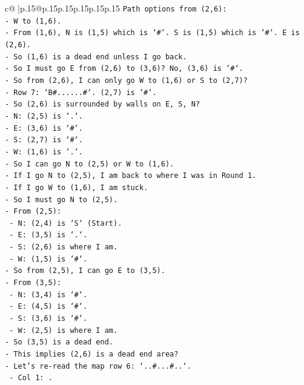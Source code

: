 \documentclass{article}
\begin{document}
{\begin{supertabular}{c@{$\;$}|p{.15\linewidth}@{}p{.15\linewidth}p{.15\linewidth}p{.15\linewidth}p{.15\linewidth}p{.15\linewidth}}
{{{\texttt{Path options from (2,6):} \\
\texttt{{-} W to (1,6).} \\
\texttt{{-} From (1,6), N is (1,5) which is `\#`. S is (1,5) which is `\#`. E is (2,6).} \\
\texttt{{-} So (1,6) is a dead end unless I go back.} \\
\texttt{{-} So I must go E from (2,6) to (3,6)? No, (3,6) is `\#`.} \\
\texttt{{-} So from (2,6), I can only go W to (1,6) or S to (2,7)?} \\
\texttt{{-} Row 7: `B\#......\#`. (2,7) is `\#`.} \\
\texttt{{-} So (2,6) is surrounded by walls on E, S, N?} \\
\texttt{{-} N: (2,5) is `.`.} \\
\texttt{{-} E: (3,6) is `\#`.} \\
\texttt{{-} S: (2,7) is `\#`.} \\
\texttt{{-} W: (1,6) is `.`.} \\
\texttt{{-} So I can go N to (2,5) or W to (1,6).} \\
\texttt{{-} If I go N to (2,5), I am back to where I was in Round 1.} \\
\texttt{{-} If I go W to (1,6), I am stuck.} \\
\texttt{{-} So I must go N to (2,5).} \\
\texttt{{-} From (2,5):} \\
\texttt{  {-} N: (2,4) is `S` (Start).} \\
\texttt{  {-} E: (3,5) is `.`.} \\
\texttt{  {-} S: (2,6) is where I am.} \\
\texttt{  {-} W: (1,5) is `\#`.} \\
\texttt{{-} So from (2,5), I can go E to (3,5).} \\
\texttt{{-} From (3,5):} \\
\texttt{  {-} N: (3,4) is `\#`.} \\
\texttt{  {-} E: (4,5) is `\#`.} \\
\texttt{  {-} S: (3,6) is `\#`.} \\
\texttt{  {-} W: (2,5) is where I am.} \\
\texttt{{-} So (3,5) is a dead end.} \\
\texttt{{-} This implies (2,6) is a dead end area?} \\
\texttt{{-} Let's re{-}read the map row 6: `..\#...\#..`.} \\
\texttt{  {-} Col 1: .} \\
}}}
\end{supertabular}}
\end{document}
